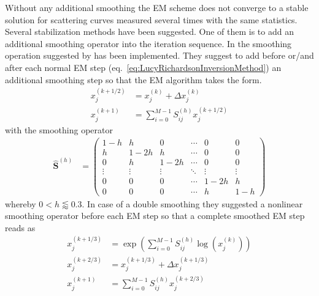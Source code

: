  Without any additional smoothing the EM scheme does not converge to a stable solution for scattering curves measured several times with the same statistics. Several stabilization methods have been suggested. One of them is to add an additional smoothing operator into the iteration sequence. In \SASfit the smoothing operation  suggested by \cite{Eggermont1999,Eggermont1995,Byrne2011} has been implemented. They suggest to add before or/and after each normal EM step (eq.\ \ref{eq:LucyRichardsonInversionMethod}) an additional smoothing step so that the EM algorithm takes the form.
\begin{align}\label{eq:smoothedEMsingle}
  x_j^{(k+1/2)} &= x_j^{(k)} + \Delta x_j^{(k)}   \\
  x_j^{(k+1)} &= \displaystyle \sum_{i=0}^{M-1} S^{(h)}_{ij} x_j^{(k+1/2)}
\end{align}
with the smoothing operator
\begin{align}\label{eq:smoothingOperator}
  \hat{\mathbf{S}}^{(h)} &=
  \begin{pmatrix}
    1-h    & h      & 0      & \cdots & 0      & 0 \\
    h      & 1-2h   & h      & \cdots & 0      & 0 \\
    0      & h      & 1-2h   & \cdots & 0      & 0 \\
    \vdots & \vdots & \vdots & \ddots & \vdots & \vdots \\
    0      & 0      & 0      & \cdots & 1-2h   & h \\
    0      & 0      & 0      & \cdots & h      & 1-h
  \end{pmatrix}
\end{align}
whereby $0 < h \lessapprox 0.3$.
In case of a double smoothing they suggested a nonlinear smoothing operator before each EM step so that a complete smoothed EM step reads as
\begin{align}\label{eq:smoothedEMdouble}
  x_j^{(k+1/3)} &= \exp\left(\sum_{i=0}^{M-1} S^{(h)}_{ij} \log\left(x_j^{(k)}\right)\right)\\
  x_j^{(k+2/3)} &= x_j^{(k+1/3)} + \Delta x_j^{(k+1/3)}  \\
  x_j^{(k+1)} &= \displaystyle \sum_{i=0}^{M-1} S^{(h)}_{ij} x_j^{(k+2/3)}
\end{align}


